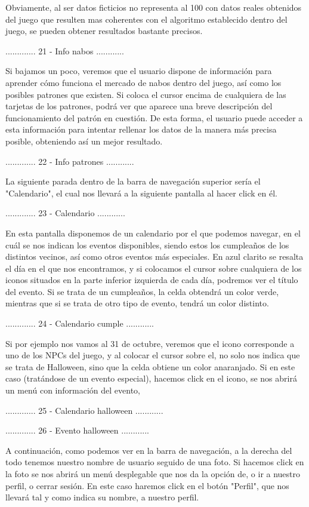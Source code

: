 Obviamente, al ser datos ficticios no representa al 100%
con datos reales obtenidos del juego que resulten mas coherentes con el algoritmo establecido
dentro del juego, se pueden obtener resultados bastante precisos.

............. 21 - Info nabos ............

Si bajamos un poco, veremos que el usuario dispone de información para aprender cómo funciona
el mercado de nabos dentro del juego, así como los posibles patrones que existen. Si coloca
el cursor encima de cualquiera de las tarjetas de los patrones, podrá ver que aparece una
breve descripción del funcionamiento del patrón en cuestión. De esta forma, el usuario puede
acceder a esta información para intentar rellenar los datos de la manera más precisa posible,
obteniendo así un mejor resultado.

............. 22 - Info patrones ............

La siguiente parada dentro de la barra de navegación superior sería el "Calendario", el cual
nos llevará a la siguiente pantalla al hacer click en él.

............. 23 - Calendario ............

En esta pantalla disponemos de un calendario por el que podemos navegar, en el cuál se nos
indican los eventos disponibles, siendo estos los cumpleaños de los distintos vecinos, así como
otros eventos más especiales. En azul clarito se resalta el día en el que nos encontramos,
y si colocamos el cursor sobre cualquiera de los iconos situados en la parte inferior izquierda
de cada día, podremos ver el título del evento. Si se trata de un cumpleaños, la celda obtendrá
un color verde, mientras que si se trata de otro tipo de evento, tendrá un color distinto.

............. 24 - Calendario cumple ............

Si por ejemplo nos vamos al 31 de octubre, veremos que el icono corresponde a uno de los NPCs
del juego, y al colocar el cursor sobre el, no solo nos indica que se trata de Halloween, sino
que la celda obtiene un color anaranjado. Si en este caso (tratándose de un evento especial),
hacemos click en el icono, se nos abrirá un menú con información del evento,

............. 25 - Calendario halloween ............

............. 26 - Evento halloween ............

A continuación, como podemos ver en la barra de navegación, a la derecha del todo tenemos
nuestro nombre de usuario seguido de una foto. Si hacemos click en la foto se nos abrirá un
menú desplegable que nos da la opción de, o ir a nuestro perfil, o cerrar sesión. En este caso
haremos click en el botón "Perfil", que nos llevará tal y como indica su nombre, a nuestro perfil.

